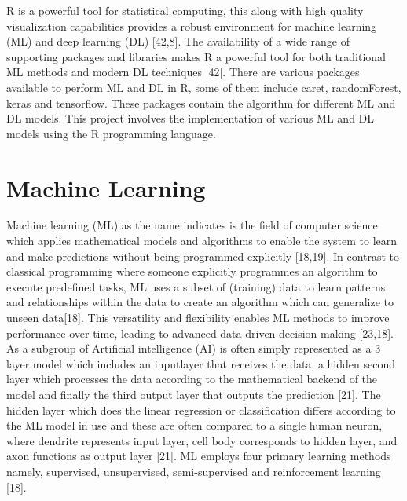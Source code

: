 \documentclass[12pt,a4paper]{report}
\begin{document}
R is a powerful tool for statistical computing, this along with high quality visualization capabilities provides a robust environment for machine learning (ML) and deep learning (DL) [42,8]. The availability of a wide range of supporting packages and libraries makes R a powerful tool for both traditional ML methods and modern DL techniques [42]. There are various packages available to perform ML and DL in R, some of them include caret, randomForest, keras and tensorflow. These packages contain the algorithm for different  ML and DL models. This project involves the implementation of various ML and DL models using the R programming language. \\

\section{Machine Learning}

Machine learning (ML) as the name indicates is the field of computer science which applies mathematical models and algorithms to enable the system to learn and make predictions without being programmed explicitly [18,19]. In contrast to classical programming where someone explicitly programmes an algorithm to execute predefined tasks,
ML uses a subset of (training) data to learn patterns and relationships within the data to create an algorithm which can generalize to unseen data[18]. This versatility and flexibility enables ML methods to improve performance over time, leading to advanced data driven decision making [23,18]. As a subgroup of Artificial intelligence (AI)
is often simply represented as a 3 layer model which includes an inputlayer that receives the data, a hidden second layer which processes the data according to the mathematical backend of the model and finally the third output layer that outputs the prediction [21]. The hidden layer which does the linear regression or classification differs 
according to the ML model in use and these are often compared to a single human neuron, where dendrite represents input layer, cell body corresponds to hidden layer, and axon functions as output layer [21]. ML employs four primary learning methods namely, supervised, unsupervised, semi-supervised and reinforcement learning [18]. \\
\end{document}
